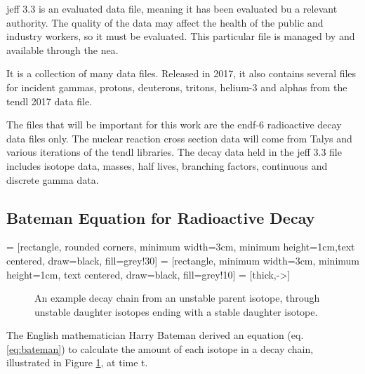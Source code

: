 \acrshort{jeff} 3.3 is an evaluated data file\cite{jeff311}, meaning it has been evaluated bu a relevant authority.  The quality of the data may affect the health of the public and industry workers, so it must be evaluated.  This particular file is managed by and available through the \acrfull{nea}.

It is a collection of many data files.  Released in 2017, it also contains several files for incident gammas, protons, deuterons, tritons, helium-3 and alphas from the \acrshort{tendl} 2017 data file.

The files that will be important for this work are the \acrshort{endf}-6 radioactive decay data files only.  The nuclear reaction cross section data will come from Talys and various iterations of the \acrshort{tendl} libraries.  The decay data held in the \acrshort{jeff} 3.3 file includes isotope data, masses, half lives, branching factors, continuous and discrete gamma data.


\subsection{Bateman Equation for Radioactive Decay}

 = [rectangle, rounded corners, minimum width=3cm, minimum height=1cm,text centered, draw=black, fill=grey!30]
 = [rectangle, minimum width=3cm, minimum height=1cm, text centered, draw=black, fill=grey!10]
 = [thick,->]

\begin{figure}[!h]
\centering
{}
\caption{An example decay chain from an unstable parent isotope, through unstable daughter isotopes ending with a stable daughter isotope.}
\label{fig:decaychain}
\end{figure}

The English mathematician Harry Bateman derived an equation (eq. \ref{eq:bateman}) to calculate the amount of each isotope in a decay chain, illustrated in Figure \ref{fig:decaychain}, at time t.

